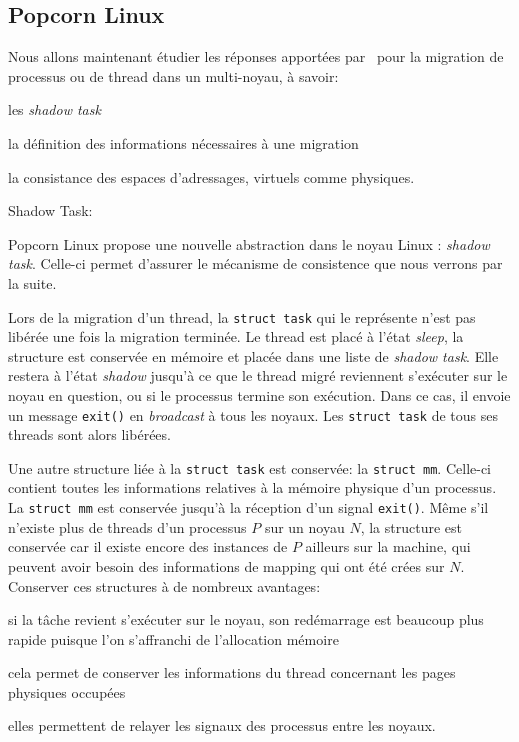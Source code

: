     \subsection{Popcorn Linux}

      Nous allons maintenant étudier les réponses apportées
      par~\citet{katz2013popcorn} pour la migration de processus ou de thread
      dans un multi-noyau, à savoir: \benumline \item les \textit{shadow
        task} \item la définition des informations nécessaires à une
      migration \item la consistance des espaces d'adressages, virtuels comme
      physiques\eenumline.

      \begin{paragraph}{Shadow Task:}

        Popcorn Linux propose une nouvelle abstraction dans le noyau Linux :
        \textit{shadow task}. Celle-ci permet d'assurer le mécanisme de
        consistence que nous verrons par la suite.

        Lors de la migration d'un thread, la \texttt{struct task} qui le
        représente n'est pas libérée une fois la migration terminée. Le thread
        est placé à l'état \textit{sleep}, la structure est conservée en mémoire
        et placée dans une liste de \textit{shadow task}. Elle restera à l'état
        \textit{shadow} jusqu'à ce que le thread migré reviennent s'exécuter sur
        le noyau en question, ou si le processus termine son exécution. Dans ce
        cas, il envoie un message \texttt{exit()} en \textit{broadcast} à tous
        les noyaux. Les \texttt{struct task} de tous ses threads sont alors
        libérées.

        Une autre structure liée à la \texttt{struct task} est conservée: la
        \texttt{struct mm}. Celle-ci contient toutes les informations relatives
        à la mémoire physique d'un processus. La \texttt{struct mm} est
        conservée jusqu'à la réception d'un signal \texttt{exit()}. Même s'il
        n'existe plus de threads d'un processus $P$ sur un noyau $N$, la
        structure est conservée car il existe encore des instances de $P$
        ailleurs sur la machine, qui peuvent avoir besoin des informations de
        mapping qui ont été crées sur $N$.\\

        Conserver ces structures à de nombreux avantages:\benumline \item
        si la tâche revient s'exécuter sur le noyau, son redémarrage est
        beaucoup plus rapide puisque l'on s'affranchi de l'allocation
        mémoire \item cela permet de conserver les informations du thread
        concernant les pages physiques occupées \item elles permettent de
        relayer les signaux des processus entre les noyaux\eenumline.

      \end{paragraph}

